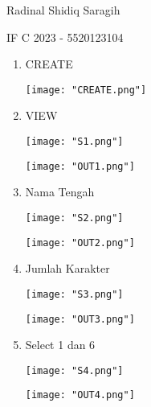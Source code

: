 \documentclass[12pt,a4paper]{article}
\date{}
\begin{document}
Radinal Shidiq Saragih

IF C 2023 - 5520123104

\begin{enumerate}

  \item CREATE

  \begin{center}
    \texttt{[image: "CREATE.png"]}
  \end{center}

  \item VIEW

  \begin{center}
    \texttt{[image: "S1.png"]}
  \end{center}

  \begin{center}
    \texttt{[image: "OUT1.png"]}
  \end{center}

  \item Nama Tengah

  \begin{center}
    \texttt{[image: "S2.png"]}
  \end{center}

  \begin{center}
    \texttt{[image: "OUT2.png"]}
  \end{center}

  \item Jumlah Karakter

  \begin{center}
    \texttt{[image: "S3.png"]}
  \end{center}

  \begin{center}
    \texttt{[image: "OUT3.png"]}
  \end{center}

  \item Select 1 dan 6

  \begin{center}
    \texttt{[image: "S4.png"]}
  \end{center}

  \begin{center}
    \texttt{[image: "OUT4.png"]}
  \end{center}

\end{enumerate}
\end{document}
